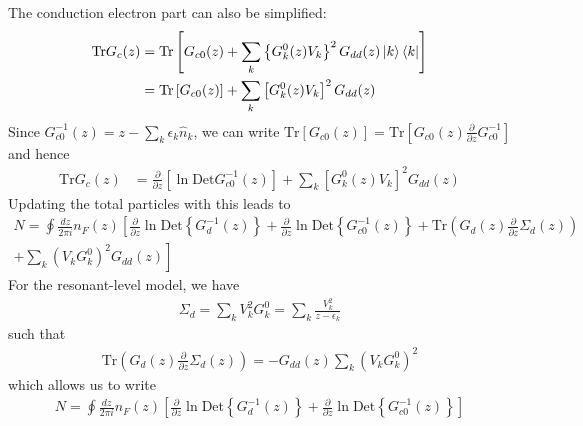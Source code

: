 \documentclass[12pt,twoside]{article}
\numberwithin{equation}{section}
\begin{document}
The conduction electron part can also be simplified:
\begin{equation}\begin{aligned}
	\text{Tr}G_c(z) &= \text{Tr}\left[G_{c0}(z) + \sum_k \left\{G_k^0(z)V_k\right\}^2 G_{dd}(z)\ket{k}\bra{k}\right]\\
			&=\text{Tr}\left[G_{c0}(z)\right] + \sum_k\left[G_k^0(z)V_k\right]^2 G_{dd}(z)\\
\end{aligned}\end{equation}
Since \(G_{c0}^{-1}(z) = z - \sum_k \epsilon_k \hat n_k\), we can write \(\text{Tr}\left[G_{c0}(z)\right] = \text{Tr}\left[G_{c0}(z) \frac{\partial{}}{\partial{z}}G_{c0}^{-1}\right]\) and hence
\begin{equation}\begin{aligned}
	\text{Tr}G_c(z) &=\frac{\partial{}}{\partial{z}}\left[\ln \text{Det}G_{c0}^{-1}(z)\right] + \sum_k\left[G_k^0(z)V_k\right]^2 G_{dd}(z)
\end{aligned}\end{equation}
Updating the total particles with this leads to
\begin{equation}\begin{aligned}
	N  = \oint \frac{dz}{2\pi i}n_F(z) \left[\frac{\partial{}}{\partial{z}} \ln \text{Det} \left\{G^{-1}_d(z)\right\} + \frac{\partial{}}{\partial{z}} \ln \text{Det} \left\{G^{-1}_{c0}(z)\right\} + \text{Tr} \left( G_d(z) \frac{\partial{}}{\partial{z}}\Sigma_d(z) \right) \right.\\
	+ \left.\sum_k\left( V_k G_k^0 \right)^2 G_{dd}(z)\right]
\end{aligned}\end{equation}
For the resonant-level model, we have
\begin{equation}\begin{aligned}
	\Sigma_d = \sum_k V^2_k G^0_k = \sum_k \frac{V_k^2}{z - \epsilon_k}
\end{aligned}\end{equation}
such that
\begin{equation}\begin{aligned}
	\text{Tr} \left( G_d(z) \frac{\partial{}}{\partial{z}}\Sigma_d(z) \right) = -G_{dd}(z) \sum_k \left( V_k G_k^0 \right)^2
\end{aligned}\end{equation}
which allows us to write
\begin{equation}\begin{aligned}
	N  = \oint \frac{dz}{2\pi i}n_F(z) \left[\frac{\partial{}}{\partial{z}} \ln \text{Det} \left\{G^{-1}_d(z)\right\} + \frac{\partial{}}{\partial{z}} \ln \text{Det} \left\{G^{-1}_{c0}(z)\right\} \right]
\end{aligned}\end{equation}
\end{document}
